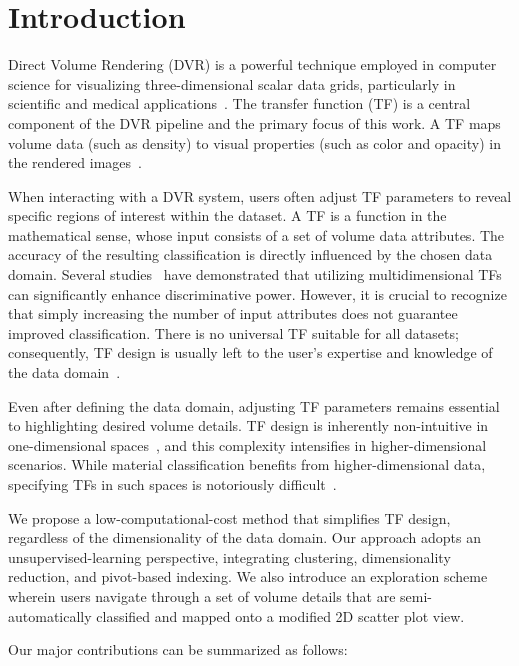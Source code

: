 \section{Introduction}
\label{sect:introduction}

Direct Volume Rendering (DVR) is a powerful technique employed in computer science for visualizing three-dimensional scalar data grids, particularly in scientific and medical applications~\cite{elvins1992, xu2021}. The transfer function (TF) is a central component of the DVR pipeline and the primary focus of this work. A TF maps volume data (such as density) to visual properties (such as color and opacity) in the rendered images~\cite{ljung2016}.

When interacting with a DVR system, users often adjust TF parameters to reveal specific regions of interest within the dataset. A TF is a function in the mathematical sense, whose input consists of a set of volume data attributes. The accuracy of the resulting classification is directly influenced by the chosen data domain. Several studies~\cite{ljung2016, cai2017, pfister2001, roettger2005} have demonstrated that utilizing multidimensional TFs can significantly enhance discriminative power. However, it is crucial to recognize that simply increasing the number of input attributes does not guarantee improved classification. There is no universal TF suitable for all datasets; consequently, TF design is usually left to the user's expertise and knowledge of the data domain~\cite{arens2010}.

Even after defining the data domain, adjusting TF parameters remains essential to highlighting desired volume details. TF design is inherently non-intuitive in one-dimensional spaces~\cite{pfister2001, wang2011}, and this complexity intensifies in higher-dimensional scenarios. While material classification benefits from higher-dimensional data, specifying TFs in such spaces is notoriously difficult~\cite{ljung2016, pfister2001, kniss2002, pan2024}.  

We propose a low-computational-cost method that simplifies TF design, regardless of the dimensionality of the data domain. Our approach adopts an unsupervised-learning perspective, integrating clustering, dimensionality reduction, and pivot-based indexing. We also introduce an exploration scheme wherein users navigate through a set of volume details that are semi-automatically classified and mapped onto a modified 2D scatter plot view.


Our major contributions can be summarized as follows:

